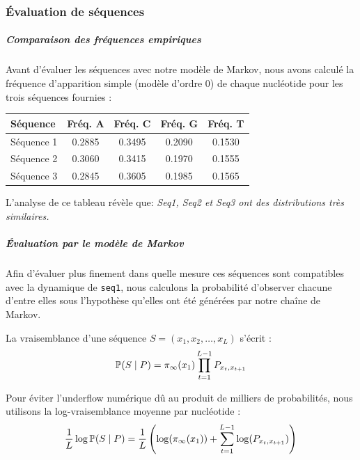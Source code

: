 \subsubsection{Évaluation de séquences}

\paragraph{ }
\subparagraph{Comparaison des fréquences empiriques}
Avant d'évaluer les séquences avec notre modèle de Markov, 
nous avons calculé la fréquence d'apparition simple (modèle d'ordre 0) de chaque 
nucléotide pour les trois séquences fournies :

\begin{center}
\renewcommand{\arraystretch}{1.2}
\begin{tabular}{|l|c|c|c|c|}
    \hline
    \textbf{Séquence} & \textbf{Fréq. A} & \textbf{Fréq. C} & \textbf{Fréq. G} & \textbf{Fréq. T} \\
    \hline
    Séquence 1 & 0.2885 & 0.3495 & 0.2090 & 0.1530 \\ 
    Séquence 2 & 0.3060 & 0.3415 & 0.1970 & 0.1555 \\ 
    Séquence 3 & 0.2845 & 0.3605 & 0.1985 & 0.1565 \\ 
    \hline
\end{tabular}
\end{center}

L'analyse de ce tableau révèle que:  
\textit{Seq1, Seq2 et Seq3 ont des distributions très similaires.}

\subparagraph{Évaluation par le modèle de Markov}
Afin d'évaluer plus finement dans quelle mesure ces séquences sont compatibles avec 
la dynamique de \texttt{seq1}, nous calculons la probabilité d'observer chacune d'entre 
elles sous l'hypothèse qu'elles ont été générées par notre chaîne de Markov.

La vraisemblance d'une séquence $S = (x_1, x_2, \dots, x_L)$ s'écrit :
\begin{equation}
    \mathbb{P}(S \mid P) = \pi_\infty(x_1) \prod_{t=1}^{L-1} P_{x_t, x_{t+1}}
\end{equation}

Pour éviter l'underflow numérique dû au produit de milliers de probabilités, 
nous utilisons la log-vraisemblance moyenne par nucléotide :
\begin{equation}
    \frac{1}{L} \log \mathbb{P}(S \mid P) = \frac{1}{L} \left( \log(\pi_\infty(x_1)) + \sum_{t=1}^{L-1} \log(P_{x_t, x_{t+1}}) \right)
\end{equation}

